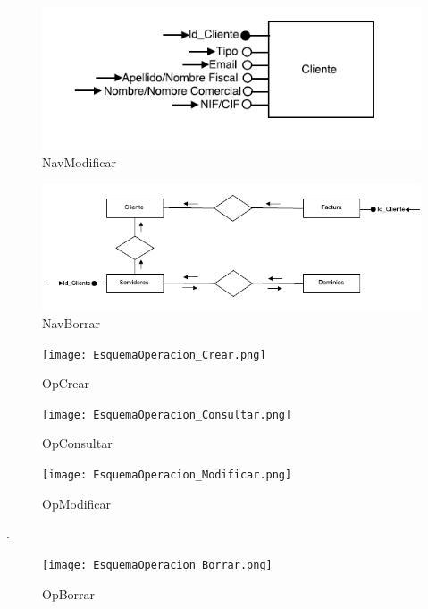 \documentclass[paper=a4, fontsize=11pt, spanish]{scrartcl}
\begin{document}
\begin{figure}
	\includegraphics[width=1.20\textwidth]{NavModificar.png}
	\caption{NavModificar}
	\label{fig:NavModificar}
\end{figure}

\begin{figure}
	\includegraphics[width=1.20\textwidth]{NavBorrar.png}
	\caption{NavBorrar}
	\label{fig:NavBorrar}
\end{figure}

\begin{figure}
	\texttt{[image: EsquemaOperacion\_Crear.png]}
	\caption{OpCrear}
	\label{fig:OpCrear}
\end{figure}

\begin{figure}
	\texttt{[image: EsquemaOperacion\_Consultar.png]}
	\caption{OpConsultar}
	\label{fig:OpConsultar}
\end{figure}

\begin{figure}
	\texttt{[image: EsquemaOperacion\_Modificar.png]}
	\caption{OpModificar}
	\label{fig:OpModificar}
\end{figure}
\newpage
.
\newpage
\begin{figure}
	\texttt{[image: EsquemaOperacion\_Borrar.png]}
	\caption{OpBorrar}
	\label{fig:OpBorrar}
\end{figure}
\end{document}
